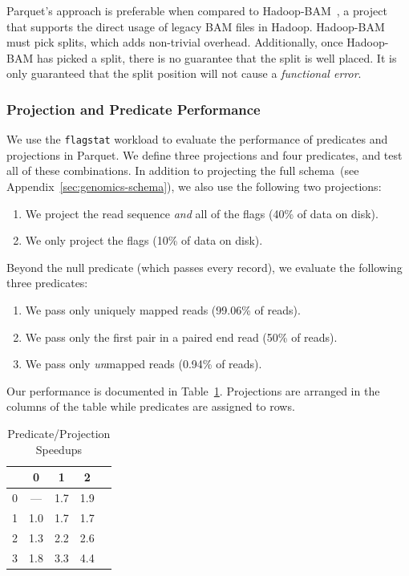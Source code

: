 \documentclass{acm_proc_article-sp}
\begin{document}
Parquet's approach is preferable when compared to Hadoop-BAM~\cite{niemenmaa12}, a project that supports
the direct usage of legacy BAM files in Hadoop. Hadoop-BAM must pick splits, which adds non-trivial overhead.
Additionally, once Hadoop-BAM has picked a split, there is no guarantee that the split is well placed. It is only
guaranteed that the split position will not cause a \emph{functional error}.

\subsubsection{Projection and Predicate Performance}
\label{sec:projection-predicate-performance}

We use the \texttt{flagstat} workload to evaluate the performance of predicates and projections in Parquet.
We define three projections and four predicates, and test all of these combinations. In addition to projecting the
full schema~(see Appendix~\ref{sec:genomics-schema}), we also use the following two projections:

\begin{enumerate}
\item We project the read sequence \emph{and} all of the flags (40\% of data on disk).
\item We only project the flags (10\% of data on disk).
\end{enumerate}

Beyond the null predicate (which passes every record), we evaluate the following three predicates:

\begin{enumerate}
\item We pass only uniquely mapped reads (99.06\% of reads).
\item We pass only the first pair in a paired end read (50\% of reads).
\item We pass only \emph{un}mapped reads (0.94\% of reads).
\end{enumerate}

Our performance is documented in Table~\ref{tab:ppp}. Projections are arranged in the columns of the table
while predicates are assigned to rows.

\begin{table}[h]
\caption{Predicate/Projection Speedups}
\label{tab:ppp}
\begin{center}
\begin{tabular}{ l | c c c c }
\hline
& 0 & 1 & 2 \\
\hline
\hline
0 & --- & 1.7 & 1.9 \\
1 & 1.0 & 1.7 & 1.7 \\
2 & 1.3 & 2.2 & 2.6 \\
3 & 1.8 & 3.3 & 4.4 \\
\hline
\end{tabular}
\end{center}
\end{table}
\end{document}
